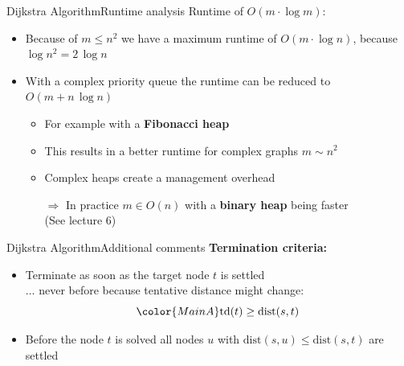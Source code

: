 \begin{frame}{Dijkstra Algorithm}{Runtime analysis}
  Runtime of {\color{MainA}$O(m \cdot \log m)$}:
  \begin{itemize}
    \item
      Because of {\color{MainA}$m \leq n^2$} we have a maximum runtime of
      {\color{MainA}$O(m \cdot \log n)$}, because
      {\color{MainA}$\log n^2 = 2 \, \log n$}
    \item
      With a complex {\color{MainA}priority queue} the runtime can be
      reduced to {\color{MainA}$O(m + n \, \log n)$}
      \begin{itemize}
        \item
          For example with a \textbf{Fibonacci heap}
        \item
          This results in a better runtime for complex graphs
          {\color{MainA}$m \sim n^2$}
        \item
          Complex heaps create a management overhead
        \item[$\Rightarrow$]
          In practice {\color{MainA}$m \in O(n)$} with a
          \textbf{binary heap} being faster\\
          {\color{gray}(See lecture 6)}
      \end{itemize}
  \end{itemize}
\end{frame}


\begin{frame}{Dijkstra Algorithm}{Additional comments}
  \textbf{Termination criteria:}
  \begin{itemize}
    \item
      Terminate as soon as the target node {\color{MainA}$t$} is settled\\
      $\ldots$ never before because tentative distance might change:
      \begin{displaymath}
        {\color{MainA}\mathrm{td}(t) \geq \mathrm{dist}(s, t)}
      \end{displaymath}
    \item
      Before the node {\color{MainA}$t$} is solved
      {\color{MainA}all nodes $u$} with
      {\color{MainA}$\mathrm{dist}(s, u) \leq \mathrm{dist}(s, t)$}
      are settled
  \end{itemize}
\end{frame}


